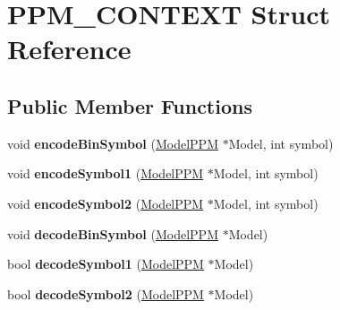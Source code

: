 \hypertarget{struct_p_p_m___c_o_n_t_e_x_t}{\section{P\-P\-M\-\_\-\-C\-O\-N\-T\-E\-X\-T Struct Reference}
\label{struct_p_p_m___c_o_n_t_e_x_t}
}
\subsection*{Public Member Functions}
\begin{DoxyCompactItemize}
\item 
\hypertarget{struct_p_p_m___c_o_n_t_e_x_t_aca54b416b67385bfc184af3324076872}{void {\bfseries encode\-Bin\-Symbol} (\hyperlink{class_model_p_p_m}{Model\-P\-P\-M} $\ast$Model, int symbol)}\label{struct_p_p_m___c_o_n_t_e_x_t_aca54b416b67385bfc184af3324076872}

\item 
\hypertarget{struct_p_p_m___c_o_n_t_e_x_t_a71656afab0ae5486d00709235fdacfc5}{void {\bfseries encode\-Symbol1} (\hyperlink{class_model_p_p_m}{Model\-P\-P\-M} $\ast$Model, int symbol)}\label{struct_p_p_m___c_o_n_t_e_x_t_a71656afab0ae5486d00709235fdacfc5}

\item 
\hypertarget{struct_p_p_m___c_o_n_t_e_x_t_af10c3c49128d844dd3348741f6aec81f}{void {\bfseries encode\-Symbol2} (\hyperlink{class_model_p_p_m}{Model\-P\-P\-M} $\ast$Model, int symbol)}\label{struct_p_p_m___c_o_n_t_e_x_t_af10c3c49128d844dd3348741f6aec81f}

\item 
\hypertarget{struct_p_p_m___c_o_n_t_e_x_t_a1f2d13441e65a192e48c5b140b3d3440}{void {\bfseries decode\-Bin\-Symbol} (\hyperlink{class_model_p_p_m}{Model\-P\-P\-M} $\ast$Model)}\label{struct_p_p_m___c_o_n_t_e_x_t_a1f2d13441e65a192e48c5b140b3d3440}

\item 
\hypertarget{struct_p_p_m___c_o_n_t_e_x_t_af2e9116c0b979e06eaf058f0254ea2ba}{bool {\bfseries decode\-Symbol1} (\hyperlink{class_model_p_p_m}{Model\-P\-P\-M} $\ast$Model)}\label{struct_p_p_m___c_o_n_t_e_x_t_af2e9116c0b979e06eaf058f0254ea2ba}

\item 
\hypertarget{struct_p_p_m___c_o_n_t_e_x_t_aaeb6637b300edf35c2302db58f5a7eea}{bool {\bfseries decode\-Symbol2} (\hyperlink{class_model_p_p_m}{Model\-P\-P\-M} $\ast$Model)}\label{struct_p_p_m___c_o_n_t_e_x_t_aaeb6637b300edf35c2302db58f5a7eea}


\end{DoxyCompactItemize}
